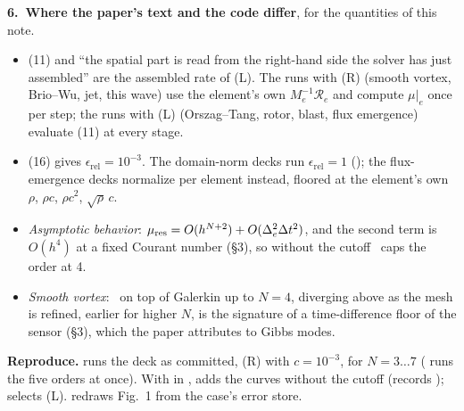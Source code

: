 \documentclass[10pt]{article}
\newcommand{\Rc}{\mathcal{R}}
\newcommand{\erel}{\epsilon_{\mathrm{rel}}}
\begin{document}
\textbf{6.\ Where the paper's text and the code differ}, for the quantities of this note.
\begin{itemize}[leftmargin=12pt]
\item (11) and ``the spatial part is read from the right-hand side the solver has just assembled'' are the assembled rate of (L).
The runs with (R) (smooth vortex, Brio--Wu, jet, this wave) use the element's own $M_e^{-1}\Rc_e$ and compute $\mu|_e$ once per
step; the runs with (L) (Orszag--Tang, rotor, blast, flux emergence) evaluate (11) at every stage.
\item (16) gives $\erel=10^{-3}$. The domain-norm decks run $\erel=1$ (); the flux-emergence decks
normalize per element instead, floored at the element's own $\rho$, $\rho c$, $\rho c^2$, $\sqrt\rho\,c$.
\item \emph{Asymptotic behavior}: $\mu_{\rm res}=O(h^{N+2})+O(\Delta_e^2\Delta t^2)$, and the second term is $O(h^4)$ at a fixed
Courant number (\S3), so without the cutoff \dsgs\ caps the order at 4.
\item \emph{Smooth vortex}: \dsgs\ on top of Galerkin up to $N=4$, diverging above as the mesh is refined, earlier for higher $N$,
is the signature of a time-difference floor of the sensor (\S3), which the paper attributes to Gibbs modes.
\end{itemize}

\textbf{Reproduce.}  runs the deck as committed, (R) with $c=10^{-3}$, for $N=3\ldots7$
( runs the five orders at once). With  in ,
 adds the curves without the cutoff (records );
 selects (L).  redraws Fig.~1 from the case's error store.
\end{document}
